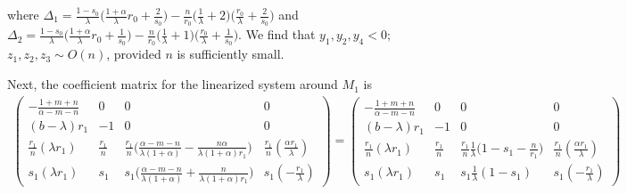 \documentclass[11pt]{article}
\def\BO{{{O}}}
\theoremstyle{remark}
\begin{document}
where $\Delta_1 = \frac{1-s_0}{\lambda}\big(\frac{1+\alpha}{\lambda}r_0 + \frac{2}{s_0}\big) -\frac{n}{r_0} \big( \frac{1}{\lambda} + 2\big)\big(\frac{r_0}{\lambda} + \frac{2}{s_0}\big)$
and $\Delta_2 = \frac{1-s_0}{\lambda}\big(\frac{1+\alpha}{\lambda}r_0 + \frac{1}{s_0}\big) -\frac{n}{r_0} \big( \frac{1}{\lambda} + 1\big)\big(\frac{r_0}{\lambda} + \frac{1}{s_0}\big)$.
We find that $y_1,y_2,y_4<0$; $z_1,z_2,z_3 \sim\BO(n)$, provided $n$ is sufficiently small.

Next, the coefficient matrix for the linearized system around $M_1$ is
\begin{align*}
 \begin{pmatrix}
          -\frac{1+m+n}{\alpha-m-n} & 0 & 0 & 0\\
          (b-\lambda)r_1 & -1 & 0 & 0\\
          \frac{r_1}{n}(\lambda r_1) & \frac{r_1}{n} & \frac{r_1}{n}\Big(\frac{\alpha-m-n}{\lambda(1+\alpha)} - \frac{n\alpha}{\lambda(1+\alpha)r_1}\Big) & \frac{r_1}{n}(\frac{\alpha r_1}{\lambda})\\
          s_1(\lambda r_1) & s_1 & s_1\Big(\frac{\alpha-m-n}{\lambda(1+\alpha)} + \frac{n}{\lambda(1+\alpha)r_1}\Big) & s_1(-\frac{r_1}{\lambda})
         \end{pmatrix}
         =\begin{pmatrix}
          -\frac{1+m+n}{\alpha-m-n} & 0 & 0 & 0\\
          (b-\lambda)r_1 & -1 & 0 & 0\\
          \frac{r_1}{n}(\lambda r_1) & \frac{r_1}{n} & \frac{r_1}{n}\frac{1}{\lambda}\Big(1-s_1-\frac{n}{r_1}\Big) & \frac{r_1}{n}(\frac{\alpha r_1}{\lambda})\\
          s_1(\lambda r_1) & s_1 & s_1\frac{1}{\lambda}(1-s_1) & s_1(-\frac{r_1}{\lambda})
         \end{pmatrix}
\end{align*}
\end{document}
